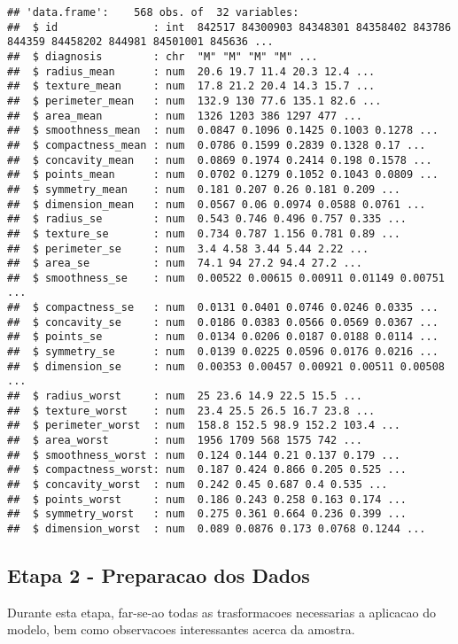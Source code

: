 \documentclass[]{article}
\begin{document}
\begin{verbatim}
## 'data.frame':    568 obs. of  32 variables:
##  $ id               : int  842517 84300903 84348301 84358402 843786 844359 84458202 844981 84501001 845636 ...
##  $ diagnosis        : chr  "M" "M" "M" "M" ...
##  $ radius_mean      : num  20.6 19.7 11.4 20.3 12.4 ...
##  $ texture_mean     : num  17.8 21.2 20.4 14.3 15.7 ...
##  $ perimeter_mean   : num  132.9 130 77.6 135.1 82.6 ...
##  $ area_mean        : num  1326 1203 386 1297 477 ...
##  $ smoothness_mean  : num  0.0847 0.1096 0.1425 0.1003 0.1278 ...
##  $ compactness_mean : num  0.0786 0.1599 0.2839 0.1328 0.17 ...
##  $ concavity_mean   : num  0.0869 0.1974 0.2414 0.198 0.1578 ...
##  $ points_mean      : num  0.0702 0.1279 0.1052 0.1043 0.0809 ...
##  $ symmetry_mean    : num  0.181 0.207 0.26 0.181 0.209 ...
##  $ dimension_mean   : num  0.0567 0.06 0.0974 0.0588 0.0761 ...
##  $ radius_se        : num  0.543 0.746 0.496 0.757 0.335 ...
##  $ texture_se       : num  0.734 0.787 1.156 0.781 0.89 ...
##  $ perimeter_se     : num  3.4 4.58 3.44 5.44 2.22 ...
##  $ area_se          : num  74.1 94 27.2 94.4 27.2 ...
##  $ smoothness_se    : num  0.00522 0.00615 0.00911 0.01149 0.00751 ...
##  $ compactness_se   : num  0.0131 0.0401 0.0746 0.0246 0.0335 ...
##  $ concavity_se     : num  0.0186 0.0383 0.0566 0.0569 0.0367 ...
##  $ points_se        : num  0.0134 0.0206 0.0187 0.0188 0.0114 ...
##  $ symmetry_se      : num  0.0139 0.0225 0.0596 0.0176 0.0216 ...
##  $ dimension_se     : num  0.00353 0.00457 0.00921 0.00511 0.00508 ...
##  $ radius_worst     : num  25 23.6 14.9 22.5 15.5 ...
##  $ texture_worst    : num  23.4 25.5 26.5 16.7 23.8 ...
##  $ perimeter_worst  : num  158.8 152.5 98.9 152.2 103.4 ...
##  $ area_worst       : num  1956 1709 568 1575 742 ...
##  $ smoothness_worst : num  0.124 0.144 0.21 0.137 0.179 ...
##  $ compactness_worst: num  0.187 0.424 0.866 0.205 0.525 ...
##  $ concavity_worst  : num  0.242 0.45 0.687 0.4 0.535 ...
##  $ points_worst     : num  0.186 0.243 0.258 0.163 0.174 ...
##  $ symmetry_worst   : num  0.275 0.361 0.664 0.236 0.399 ...
##  $ dimension_worst  : num  0.089 0.0876 0.173 0.0768 0.1244 ...
\end{verbatim}

\subsection{Etapa 2 - Preparacao dos
Dados}\label{etapa-2---preparacao-dos-dados}

Durante esta etapa, far-se-ao todas as trasformacoes necessarias a
aplicacao do modelo, bem como observacoes interessantes acerca da
amostra.
\end{document}
